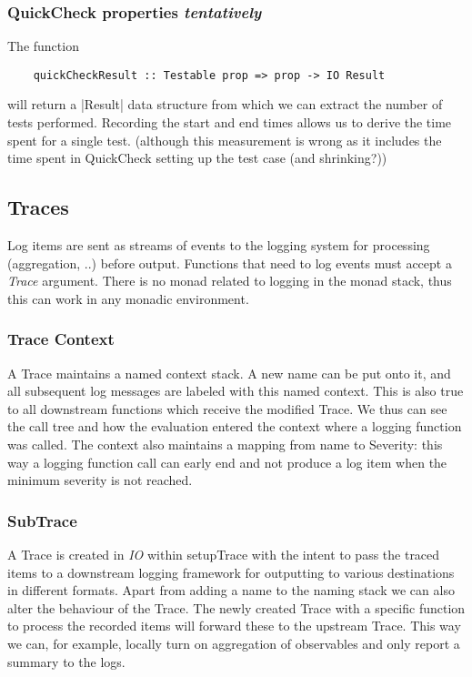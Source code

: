 \subsubsection{QuickCheck properties \emph{tentatively}} The function
\begin{verbatim}
    quickCheckResult :: Testable prop => prop -> IO Result
\end{verbatim}
will return a |Result| data structure from which we can extract the number of
tests performed.
Recording the start and end times allows us to derive the time spent for a
single test. (although this measurement is wrong as it includes the time spent
in QuickCheck setting up the test case (and shrinking?))

\subsection{Traces}
Log items are sent as streams of events to the logging system for processing
(aggregation, ..) before output. Functions that need to log events must accept
a \emph{Trace} argument. There is no monad related to logging in the monad
stack, thus this can work in any monadic environment.

\subsubsection{Trace Context}
A Trace maintains a named context stack. A new name can be put onto it, and all
subsequent log messages are labeled with this named context. This is also true
to all downstream functions which receive the modified Trace. We thus can see
the call tree and how the evaluation entered the context where a logging
function was called.
The context also maintains a mapping from name to Severity: this way a logging
function call can early end and not produce a log item when the minimum severity
is not reached.

\subsubsection{SubTrace}
A Trace is created in \emph{IO} within setupTrace with the intent to pass the
traced items to a downstream logging framework for outputting to various
destinations in different formats. Apart from adding a name to the naming stack
we can also alter the behaviour of the Trace. The newly created Trace with a
specific function to process the recorded items will forward these to the
upstream Trace. This way we can, for example, locally turn on aggregation of
observables and only report a summary to the logs.

